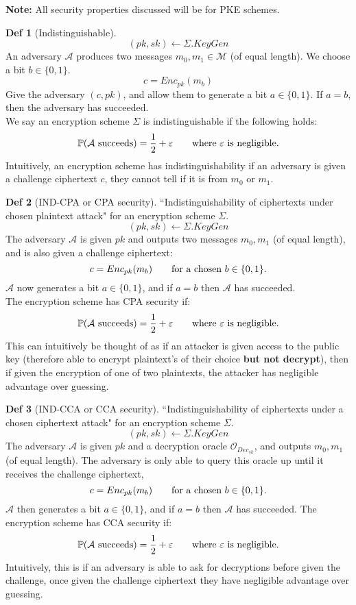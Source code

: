 \documentclass[a4paper, 10pt]{article}
\theoremstyle{definition}
\newtheorem{definition}{Def}[section]
\begin{document}
\textbf{Note:} All security properties discussed will be for \ac{PKE} schemes.
\begin{definition}[Indistinguishable]
    \[(pk, sk) \leftarrow \Sigma.KeyGen \]
    An adversary $\mathcal{A}$ produces two messages $m_0, m_1 \in \mathcal{M}$ (of equal length).
    We choose a bit $b \in \{0,1\}$.
    \[c = Enc_{pk}(m_b)\] 
    Give the adversary $(c, pk)$, and allow them to generate a bit $a \in \{ 0,1\}$. If $a=b$, then the adversary has succeeded.\\
    We say an encryption scheme $\Sigma$ is indistinguishable if the following holds:
    \[\mathbb{P}(\mathcal{A} \mbox{ succeeds}) = \frac{1}{2} + \varepsilon \mbox{\qquad where $\varepsilon$ is negligible.}\] 
    Intuitively, an encryption scheme has indistinguishability if an adversary is given a challenge ciphertext $c$, they cannot tell if it is from $m_0$ or $m_1$.
\end{definition}
\begin{definition}[IND-CPA or CPA security]
    ``Indistinguishability of ciphertexts under chosen plaintext attack" for an encryption scheme $\Sigma$.\\
    \[(pk, sk) \leftarrow \Sigma.KeyGen \]
    The adversary $\mathcal{A} $ is given $pk$ and outputs two messages $m_0, m_1$ (of equal length), and is also given a challenge ciphertext:
    \[c=Enc_{pk}(m_b)\mbox{\qquad for a chosen }b \in \{ 0,1\}.\] 
    $\mathcal{A}$ now generates a bit $a \in \{ 0,1\}$, and if $a=b$ then $\mathcal{A}$ has succeeded.\\
    The encryption scheme has CPA security if:
    \[\mathbb{P} (\mathcal{A} \mbox{ succeeds}) = \frac{1}{2} + \varepsilon\mbox{\qquad where $\varepsilon$ is negligible.}\]
    This can intuitively be thought of as if an attacker is given access to the public key (therefore able to encrypt plaintext's of their choice \textbf{but not decrypt}), then if given the encryption of one of two plaintexts, the attacker has negligible advantage over guessing.
\end{definition}
\begin{definition}[IND-CCA or CCA security]
    ``Indistinguishability of ciphertexts under a chosen ciphertext attack" for an encryption scheme $\Sigma$.\\
    \[(pk, sk) \leftarrow \Sigma.KeyGen \]
    The adversary $\mathcal{A} $ is given $pk$ and a decryption oracle $\mathcal{O}_{Dec_{sk}}$, and outputs $m_0, m_1$ (of equal length). The adversary is only able to query this oracle up until it receives the challenge ciphertext,
    \[c=Enc_{pk}(m_b)\mbox{\qquad for a chosen }b \in \{ 0,1\}.\] 
    $\mathcal{A} $ then generates a bit $a \in \{ 0, 1\}$, and if $a=b$ then $\mathcal{A} $ has succeeded.
    The encryption scheme has CCA security if:
    \[\mathbb{P} (\mathcal{A} \mbox{ succeeds}) = \frac{1}{2} + \varepsilon \mbox{\qquad where $\varepsilon$ is negligible.}\]
    Intuitively, this is if an adversary is able to ask for decryptions before given the challenge, once given the challenge ciphertext they have negligible advantage over guessing.
\end{definition}
\end{document}
